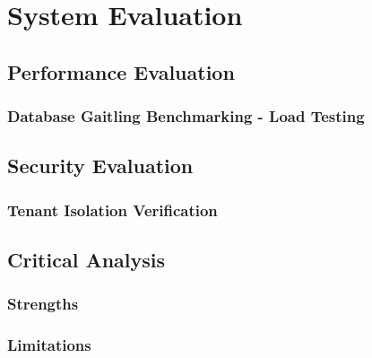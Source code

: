 \chapter{System Evaluation}
\label{chap:evaluation}

\section{Performance Evaluation}
\subsection{Database Gaitling Benchmarking - Load Testing}

\section{Security Evaluation}
\subsection{Tenant Isolation Verification}

\section{Critical Analysis}
\subsection{Strengths}
\subsection{Limitations}


